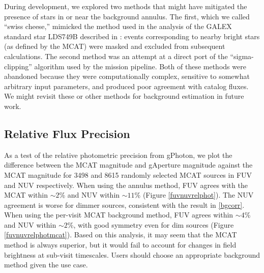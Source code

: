 \documentclass[preprint]{aastex}
\begin{document}
During development, we explored two methods that might have mitigated the presence of stars in or near the background annulus. The first, which we called ``swiss cheese,'' mimicked the method used in the analysis of the GALEX standard star LDS749B described in \citep{mor2007}: events corresponding to nearby bright stars (as defined by the MCAT) were masked and excluded from subsequent calculations. The second method was an attempt at a direct port of the ``sigma-clipping'' algorithm used by the mission pipeline. Both of these methods were abandoned because they were computationally complex, sensitive to somewhat arbitrary input parameters, and produced poor agreement with catalog fluxes. We might revisit these or other methods for background estimation in future work.

\subsection{Relative Flux Precision}
\label{relflux}
As a test of the relative photometric precision from gPhoton, we plot the difference between the MCAT magnitude and gAperture magnitude against the MCAT magnitude for 3498 and 8615 randomly selected MCAT sources in FUV and NUV respectively. When using the annulus method, FUV agrees with the MCAT within $\sim 2$\% and NUV within $\sim 11$\% (Figure \ref{fuvnuvrelphot}). The NUV agreement is worse for dimmer sources, consistent with the result in \ref{bgcorr}. When using the per-visit MCAT background method, FUV agrees within $\sim 4$\% and NUV within $\sim 2$\%, with good symmetry even for dim sources (Figure \ref{fuvnuvrelphotmcat}). Based on this analysis, it may seem that the MCAT method is always superior, but it would fail to account for changes in field brightness at sub-visit timescales. Users should choose an appropriate background method given the use case.
\end{document}
